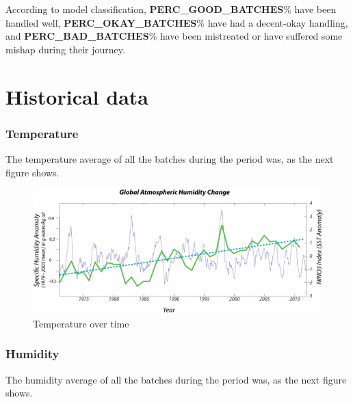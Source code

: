 \documentclass[daily]{engenius}
\begin{document}
According to model classification, \textbf{PERC\_GOOD\_BATCHES}\% have been handled well, \textbf{PERC\_OKAY\_BATCHES}\% have had a decent-okay handling, and \textbf{PERC\_BAD\_BATCHES}\% have been mistreated or have suffered some mishap during their journey.


\section{Historical data}
\subsubsection{Temperature}

The temperature average of all the batches during the period was, as the next figure shows.

\begin{figure}[!ht]
    \begin{center}
        \includegraphics[width=\textwidth/3]{../images/humidity_example.png}
        \caption{Temperature over time}
        \label{img:engeniuslogo}
    \end{center}
\end{figure}


\subsubsection{Humidity}

The humidity average of all the batches during the period was, as the next figure shows.
\end{document}
